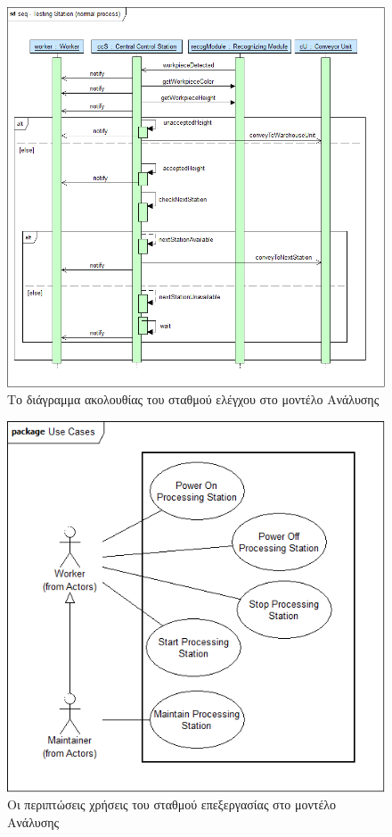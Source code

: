 \documentclass[a4paper,12pt,twoside]{report}
\begin{document}
\begin{appendices}
			\begin{figure}[hp]
					\centering
					\includegraphics[scale=0.30]{AnalysisModel_seq-TestingStation(normalprocess).png}
					\caption{Το διάγραμμα ακολουθίας του σταθμού ελέγχου στο μοντέλο Ανάλυσης}
					\label{φωτ:Το διάγραμμα ακολουθίας του σταθμού ελέγχου στο μοντέλο Ανάλυσης}
			\end{figure}
			
			\begin{figure}[hp]
					\centering
					\includegraphics[scale=0.30]{AnalysisModel_uc-ProcessingStationsUseCases.png}
					\caption{Οι περιπτώσεις χρήσεις του σταθμού επεξεργασίας στο μοντέλο Ανάλυσης}
					\label{φωτ:Οι περιπτώσεις χρήσεις του σταθμού επεξεργασίας στο μοντέλο Ανάλυσης}
			\end{figure}
			

\end{appendices}
\end{document}
